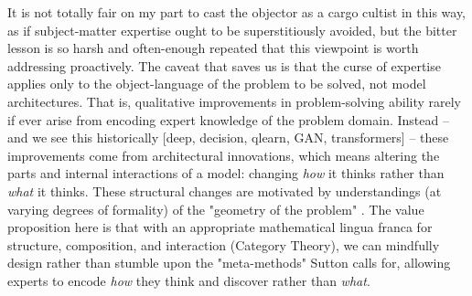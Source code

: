 It is not totally fair on my part to cast the objector as a cargo cultist in this way, as if subject-matter expertise ought to be superstitiously avoided, but the bitter lesson is so harsh and often-enough repeated that this viewpoint is worth addressing proactively. The caveat that saves us is that the curse of expertise applies only to the object-language of the problem to be solved, not model architectures. That is, qualitative improvements in problem-solving ability rarely if ever arise from encoding expert knowledge of the problem domain. Instead -- and we see this historically [deep, decision, qlearn, GAN, transformers] -- these improvements come from architectural innovations, which means altering the parts and internal interactions of a model: changing \emph{how} it thinks rather than \emph{what} it thinks. These structural changes are motivated by understandings (at varying degrees of formality) of the "geometry of the problem" \cite{}. The value proposition here is that with an appropriate mathematical lingua franca for structure, composition, and interaction (Category Theory), we can mindfully design rather than stumble upon the "meta-methods" Sutton calls for, allowing experts to encode \emph{how} they think and discover rather than \emph{what}.\\

